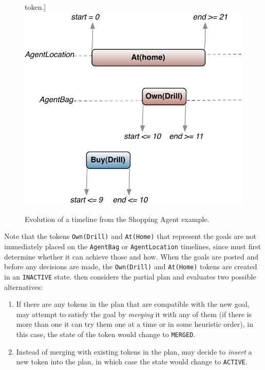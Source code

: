 \begin{description}
\begin{figure}[t]
    token.]{\label{fig:europapr:activate}\includegraphics[scale=0.4]{figs/europa-pr-activate.pdf}} 
    \caption{\small Evolution of a timeline from the Shopping Agent example.}
  \end{figure}


  Note that the tokens \texttt{Own(Drill)} and \texttt{At(Home)} that
  represent the goals are not immediately placed on the
  \texttt{AgentBag} or \texttt{AgentLocation} timelines, since \eu
  must first determine whether it can achieve those 
  and how. When the goals are posted and before any decisions are
  made, the \texttt{Own(Drill)} and \texttt{At(Home)} tokens are
  created in an \texttt{INACTIVE} state. \eu then considers the
  partial plan and evaluates two possible alternatives:

\begin{enumerate}

\item If there are any tokens in the plan that are compatible with the
  new goal, \eu may attempt to satisfy the goal by \emph{merging} it
  with any of them (if there is more than one it can try them one at a
  time or in some heuristic order), in this case, the state of the
  token would change to \texttt{MERGED}.

\item Instead of merging with existing tokens in the plan, \eu may
  decide to \emph{insert} a new token into the plan, in which case the
  state would change to \texttt{ACTIVE}.


\end{enumerate}
\end{description}
